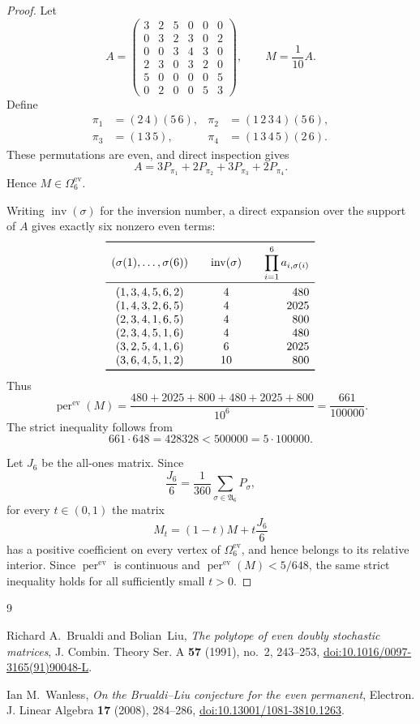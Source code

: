 \documentclass[11pt]{amsart}
\newcommand{\perev}{\operatorname{per}^{\mathrm{ev}}}
\newcommand{\Oev}{\Omega^{\mathrm{ev}}}
\newcommand{\An}{\mathfrak A}
\begin{document}
\begin{proof}
Let
\[
A=
\begin{pmatrix}
3&2&5&0&0&0\\
0&3&2&3&0&2\\
0&0&3&4&3&0\\
2&3&0&3&2&0\\
5&0&0&0&0&5\\
0&2&0&0&5&3
\end{pmatrix},
\qquad
M=\frac1{10}A.
\]
Define
\[
\begin{aligned}
\pi_1&=(2\,4)(5\,6),
&\pi_2&=(1\,2\,3\,4)(5\,6),\\
\pi_3&=(1\,3\,5),
&\pi_4&=(1\,3\,4\,5)(2\,6).
\end{aligned}
\]
These permutations are even, and direct inspection gives
\[
  A=3P_{\pi_1}+2P_{\pi_2}+3P_{\pi_3}+2P_{\pi_4}.
\]
Hence $M\in\Oev_6$.

Writing $\operatorname{inv}(\sigma)$ for the inversion number, a direct
expansion over the support of $A$ gives exactly six nonzero even terms:
\[
\begin{array}{c@{\qquad}c@{\qquad}r}
\toprule
(\sigma(1),\ldots,\sigma(6))
  & \operatorname{inv}(\sigma)
  & \displaystyle\prod_{i=1}^6 a_{i,\sigma(i)}\\
\midrule
(1,3,4,5,6,2) & 4  & 480\\
(1,4,3,2,6,5) & 4  & 2025\\
(2,3,4,1,6,5) & 4  & 800\\
(2,3,4,5,1,6) & 4  & 480\\
(3,2,5,4,1,6) & 6  & 2025\\
(3,6,4,5,1,2) & 10 & 800\\
\bottomrule
\end{array}
\]
Thus
\[
  \perev(M)
  =\frac{480+2025+800+480+2025+800}{10^6}
  =\frac{661}{100000}.
\]
The strict inequality follows from
\[
  661\cdot648=428328<500000=5\cdot100000.
\]

Let $J_6$ be the all-ones matrix. Since
\[
  \frac{J_6}{6}
  =\frac1{360}\sum_{\sigma\in\An_6}P_\sigma,
\]
for every $t\in(0,1)$ the matrix
\[
  M_t=(1-t)M+t\frac{J_6}{6}
\]
has a positive coefficient on every vertex of $\Oev_6$, and hence belongs
to its relative interior. Since $\perev$ is continuous and
$\perev(M)<5/648$, the same strict inequality holds for all sufficiently
small $t>0$.
\end{proof}

\begin{thebibliography}{9}

Richard A.~Brualdi and Bolian~Liu,
\emph{The polytope of even doubly stochastic matrices},
J. Combin. Theory Ser. A \textbf{57} (1991), no.~2, 243--253,
\href{https://doi.org/10.1016/0097-3165(91)90048-L}
{doi:10.1016/0097-3165(91)90048-L}.

Ian M.~Wanless,
\emph{On the Brualdi--Liu conjecture for the even permanent},
Electron. J. Linear Algebra \textbf{17} (2008), 284--286,
\href{https://doi.org/10.13001/1081-3810.1263}
{doi:10.13001/1081-3810.1263}.

\end{thebibliography}
\end{document}
